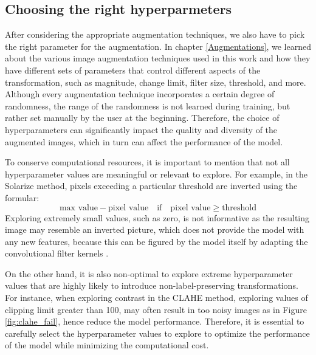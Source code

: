 \subsection{Choosing the right hyperparmeters}
After considering the appropriate augmentation techniques, we also have to pick the right parameter for the augmentation. In chapter \ref{Augmentations}, we learned about the various image augmentation techniques used in this work and how they have different sets of parameters that control different aspects of the transformation, such as magnitude, change limit, filter size, threshold, and more. Although every augmentation technique incorporates a certain degree of randomness, the range of the randomness is not learned during training, but rather set manually by the user at the beginning. Therefore, the choice of hyperparameters can significantly impact the quality and diversity of the augmented images, which in turn can affect the performance of the model.

To conserve computational resources, it is important to mention that not all hyperparameter values are meaningful or relevant to explore. For example, in the Solarize method, pixels exceeding a particular threshold are inverted using the formular:
\begin{equation}
\text{max value} - \text{pixel value} \quad \text{if} \quad \text{pixel value} \geq \text{threshold}
\end{equation}
Exploring extremely small values, such as zero, is not informative as the resulting image may resemble an inverted picture, which does not provide the model with any new features, because this can be figured by the model itself by adapting the convolutional filter kernels \cite{krizhevsky2017imagenet}. 

On the other hand, it is also non-optimal to explore extreme hyperparameter values that are highly likely to introduce non-label-preserving transformations. For instance, when exploring contrast in the CLAHE method, exploring values of clipping limit greater than 100, may often result in too noisy images as in Figure \ref{fig:clahe_fail}, hence reduce the model performance. Therefore, it is essential to carefully select the hyperparameter values to explore to optimize the performance of the model while minimizing the computational cost. 

